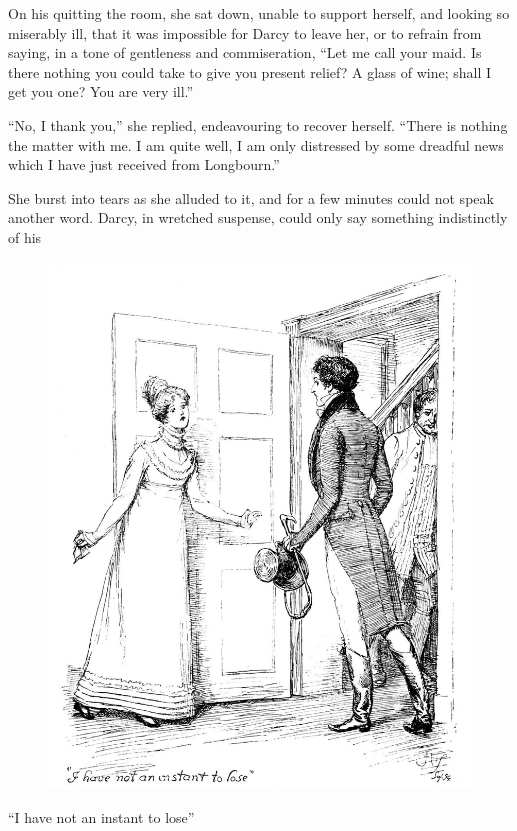 \documentclass[10pt]{book}
\begin{document}
   On his quitting the room, she sat down, unable to support herself, and
looking so miserably ill, that it was impossible for Darcy to leave her,
or to refrain from saying, in a tone of gentleness and commiseration,
“Let me call your maid. Is there nothing you could take to give you
present relief? A glass of wine; shall I get you one? You are very ill.”
  

   “No, I thank you,” she replied, endeavouring to recover herself. “There
is nothing the matter with me. I am quite well, I am only distressed by
some dreadful news which I have just received from Longbourn.”
  

   She burst into tears as she alluded to it, and for a few minutes could
not speak another word. Darcy, in wretched suspense, could only say
something indistinctly of his
  

\begin{figure}[h]
\centering
\includegraphics[width=\linewidth]{images/i_368.jpg}
\end{figure}

     “I have not an instant to lose”
    
\end{document}
